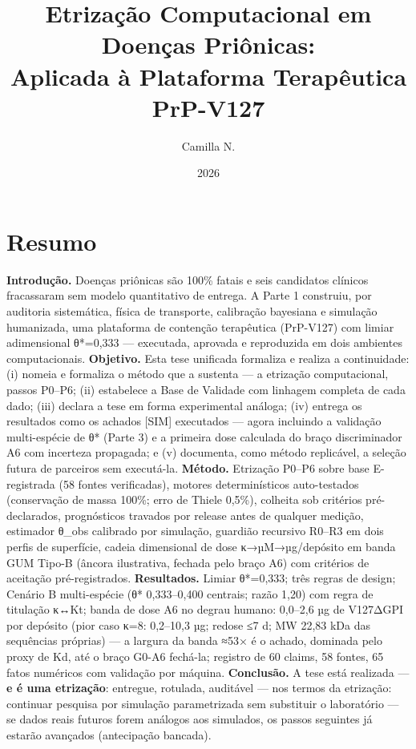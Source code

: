 \documentclass[12pt,a4paper,oneside]{report}
\title{Etrização Computacional em Doenças Priônicas:\\Aplicada à Plataforma Terapêutica PrP-V127}
\author{Camilla N.}\date{2026}
\begin{document}
\maketitle
\hypertarget{resumo}{%
\chapter*{Resumo}\label{resumo}}

\textbf{Introdução.} Doenças priônicas são 100\% fatais e seis
candidatos clínicos fracassaram sem modelo quantitativo de entrega. A
Parte 1 construiu, por auditoria sistemática, física de transporte,
calibração bayesiana e simulação humanizada, uma plataforma de contenção
terapêutica (PrP-V127) com limiar adimensional θ*=0,333 --- executada,
aprovada e reproduzida em dois ambientes computacionais.
\textbf{Objetivo.} Esta tese unificada formaliza e realiza a
continuidade: (i) nomeia e formaliza o método que a sustenta --- a
etrização computacional, passos P0--P6; (ii) estabelece a Base de
Validade com linhagem completa de cada dado; (iii) declara a tese em
forma experimental análoga; (iv) entrega os resultados como os achados
{[}SIM{]} executados --- agora incluindo a validação multi-espécie de θ*
(Parte 3) e a primeira dose calculada do braço discriminador A6 com
incerteza propagada; e (v) documenta, como método replicável, a seleção
futura de parceiros sem executá-la. \textbf{Método.} Etrização P0--P6
sobre base E-registrada (58 fontes verificadas), motores determinísticos
auto-testados (conservação de massa 100\%; erro de Thiele 0,5\%),
colheita sob critérios pré-declarados, prognósticos travados por release
antes de qualquer medição, estimador θ\_obs calibrado por simulação,
guardião recursivo R0--R3 em dois perfis de superfície, cadeia
dimensional de dose κ→µM→µg/depósito em banda GUM Tipo-B (âncora
ilustrativa, fechada pelo braço A6) com critérios de aceitação
pré-registrados. \textbf{Resultados.} Limiar θ*=0,333; três regras de
design; Cenário B multi-espécie (θ* 0,333--0,400 centrais; razão 1,20)
com regra de titulação κ↔Kt; banda de dose A6 no degrau humano: 0,0--2,6
µg de V127ΔGPI por depósito (pior caso κ=8: 0,2--10,3 µg; redose ≤7 d;
MW 22,83 kDa das sequências próprias) --- a largura da banda ≈53× é o
achado, dominada pelo proxy de Kd, até o braço G0-A6 fechá-la; registro
de 60 claims, 58 fontes, 65 fatos numéricos com validação por máquina.
\textbf{Conclusão.} A tese está realizada --- \textbf{e é uma
etrização}: entregue, rotulada, auditável --- nos termos da etrização:
continuar pesquisa por simulação parametrizada sem substituir o
laboratório --- se dados reais futuros forem análogos aos simulados, os
passos seguintes já estarão avançados (antecipação bancada).
\end{document}
